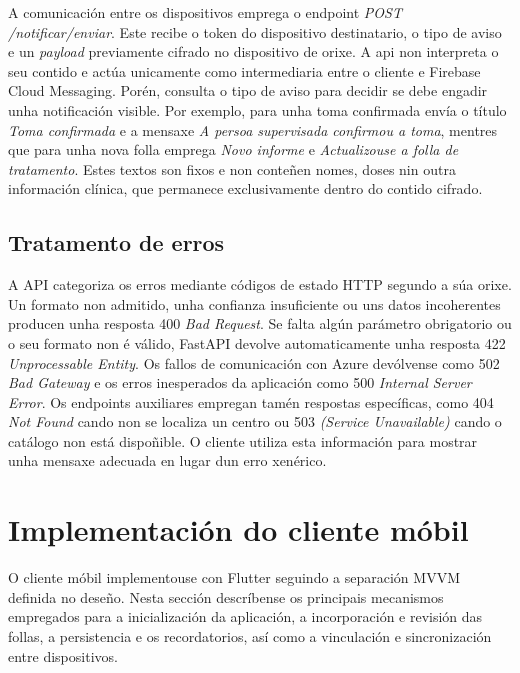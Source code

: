 A comunicación entre os dispositivos emprega o endpoint \textit{POST /notificar/enviar}. Este recibe o token do dispositivo destinatario, o tipo de aviso e un \textit{payload}  previamente cifrado no dispositivo de orixe. A \gls{api} non interpreta o seu contido e actúa unicamente como intermediaria entre o cliente e Firebase Cloud Messaging. Porén, consulta o tipo de aviso para decidir se debe engadir unha notificación visible. Por exemplo, para unha toma confirmada envía o título \textit{Toma confirmada} e a mensaxe \textit{A persoa supervisada confirmou a toma}, mentres que para unha nova folla emprega \textit{Novo informe} e \textit{Actualizouse a folla de tratamento}. Estes textos son fixos e non conteñen nomes, doses nin outra información clínica, que permanece exclusivamente dentro do contido cifrado.

%

\subsection{Tratamento de erros}
A API categoriza os erros mediante códigos de estado HTTP segundo a súa orixe. Un formato non admitido, unha confianza insuficiente ou uns datos incoherentes producen unha resposta 400 \textit{Bad Request}. Se falta algún parámetro obrigatorio ou o seu formato non é válido, FastAPI devolve automaticamente unha resposta 422 \textit{Unprocessable Entity}. Os fallos de comunicación con Azure devólvense como 502 \textit{Bad Gateway} e os erros inesperados da aplicación como 500 \textit{Internal Server Error}. Os endpoints auxiliares empregan tamén respostas específicas, como 404 \textit{Not Found} cando non se localiza un centro ou 503 \textit{(Service Unavailable)} cando o catálogo non está dispoñible. O cliente utiliza esta información para mostrar unha mensaxe adecuada en lugar dun erro xenérico.

\section{Implementación do cliente móbil}
O cliente móbil implementouse con Flutter seguindo a separación MVVM definida no deseño. Nesta sección descríbense os principais mecanismos empregados para a inicialización da aplicación, a incorporación e revisión das follas, a persistencia e os recordatorios, así como a vinculación e sincronización entre dispositivos.

